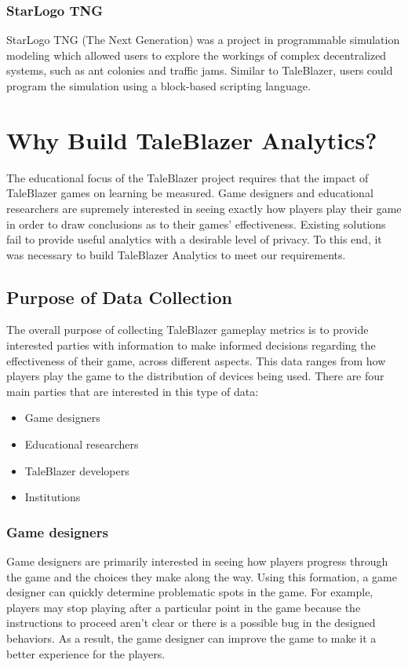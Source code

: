 \subsubsection{StarLogo TNG}

StarLogo TNG (The Next Generation) was a project in programmable simulation modeling which allowed users to explore the workings of complex decentralized systems, such as ant colonies and traffic jams. \cite{site:starlogo} Similar to TaleBlazer, users could program the simulation using a block-based scripting language. 

\section{Why Build TaleBlazer Analytics?}

The educational focus of the TaleBlazer project requires that the impact of TaleBlazer games on learning be measured. Game designers and educational researchers are supremely interested in seeing exactly how players play their game in order to draw conclusions as to their games' effectiveness. Existing solutions fail to provide useful analytics with a desirable level of privacy. To this end, it was necessary to build TaleBlazer Analytics to meet our requirements. 

\subsection{Purpose of Data Collection}

The overall purpose of collecting TaleBlazer gameplay metrics is to provide interested parties with information to make informed decisions regarding the effectiveness of their game, across different aspects. This data ranges from how players play the game to the distribution of devices being used. There are four main parties that are interested in this type of data: 
	\begin{itemize}
		\item Game designers
		\item Educational researchers
		\item TaleBlazer developers
		\item Institutions
	\end{itemize}

\subsubsection{Game designers}
Game designers are primarily interested in seeing how players progress through the game and the choices they make along the way. Using this formation, a game designer can quickly determine problematic spots in the game. For example, players may stop playing after a particular point in the game because the instructions to proceed aren't clear or there is a possible bug in the designed behaviors. As a result, the game designer can improve the game to make it a better experience for the players.

